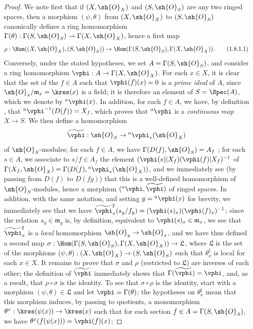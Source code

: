 \begin{proof}
We note first that if $(X,\sh{O}_X)$ and $(S,\sh{O}_S)$ are any two ringed spaces, then a morphism $(\psi,\theta)$ from $(X,\sh{O}_X)$ to $(S,\sh{O}_S)$ canonically defines a ring homomorphism $\Gamma(\theta):\Gamma(S,\sh{O}_S)\to\Gamma(X,\sh{O}_X)$, hence a first map
\[
  \label{I.1.8.1.1}
  \rho:\Hom((X,\sh{O}_X),(S,\sh{O}_S))\to\Hom(\Gamma(S,\sh{O}_S),\Gamma(X,\sh{O}_X)).
  \tag{1.8.1.1}
\]
Conversely, under the stated hypotheses, we set $A=\Gamma(S,\sh{O}_S)$, and consider a ring homomorphism $\vphi:A\to\Gamma(X,\sh{O}_X)$.
For each $x\in X$, it is clear that the set of the $f\in A$ such that $\vphi(f)(x)=0$ is a \emph{prime ideal} of $A$, since $\sh{O}_x/\mathfrak{m}_x=\kres(x)$ is a field;
it is therefore an element of $S=\Spec(A)$, which we denote by ${}^a\vphi(x)$.
  In addition, for each $f\in A$, we have, by definition , that ${}^a\vphi^{-1}(D(f))=X_f$, which proves that ${}^a\vphi$ is a \emph{continuous map} $X\to S$.
We then define a homomorphism
\[
  \widetilde{\vphi}:\sh{O}_S\to{}^a\vphi_*(\sh{O}_X)
\]
of $\sh{O}_S$-modules;
for each $f\in A$, we have $\Gamma(D(f),\sh{O}_S)=A_f$ ;
for each $s\in A$, we associate to $s/f\in A_f$ the element $(\vphi(s)|X_f)(\vphi(f)|X_f)^{-1}$ of $\Gamma(X_f,\sh{O}_X)=\Gamma(D(f),{}^a\vphi_*(\sh{O}_X))$, and we immediately see (by passing from $D(f)$ to $D(fg)$) that this is a well-defined homomorphism of $\sh{O}_S$-modules, hence a morphism $({}^a\vphi,\widetilde{\vphi})$ of ringed spaces.
In addition, with the same notation, and setting $y={}^a\vphi(x)$ for brevity, we immediately see  that we have $\widetilde{\vphi}_x^\sharp(s_y/f_y)=(\vphi(s)_x)(\vphi(f)_x)^{-1}$;
since the relation $s_y\in\mathfrak{m}_y$ is, by definition, equivalent to $\vphi(s)_x\in\mathfrak{m}_x$, we see that $\widetilde{\vphi}_x^\sharp$ is a \emph{local} homomorphism $\sh{O}_y\to\sh{O}_x$, and we have thus defined a second map $\sigma:\Hom(\Gamma(S,\sh{O}_S),\Gamma(X,\sh{O}_X))\to\mathfrak{L}$, where $\mathfrak{L}$ is the set of the morphisms $(\psi,\theta):(X,\sh{O}_X)\to(S,\sh{O}_S)$ such that $\theta_x^\sharp$ is local for each $x\in X$.
It remains to prove that $\sigma$ and $\rho$ (restricted to $\mathfrak{L}$) are inverses of each other;
the definition of $\widetilde{\vphi}$ immediately shows that $\Gamma(\widetilde{\vphi})=\vphi$, and, as a result, that $\rho\circ\sigma$ is the identity.
To see that $\sigma\circ\rho$ is the identity, start with a morphism $(\psi,\theta)\in\mathfrak{L}$ and let $\vphi=\Gamma(\theta)$;
the hypotheses on $\theta_x^\sharp$ mean that this morphism induces, by passing to quotients, a monomorphism $\theta^x:\kres(\psi(x))\to\kres(x)$ such that for each section $f\in A=\Gamma(S,\sh{O}_S)$, we have $\theta^x(f(\psi(x)))=\vphi(f)(x)$;

\end{proof}
